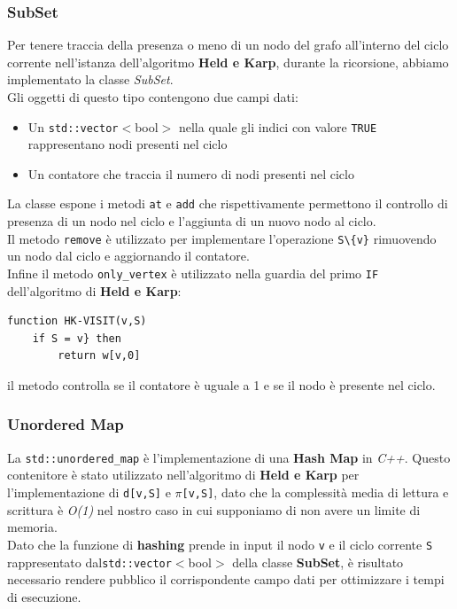 \documentclass[]{article}
\begin{document}
\subsubsection{SubSet}
\begin{flushleft}
Per tenere traccia della presenza o meno di un nodo del grafo all'interno del ciclo corrente nell'istanza dell'algoritmo \textbf{Held e Karp}, durante la ricorsione, abbiamo implementato la classe \textit{SubSet}.\\
Gli oggetti di questo tipo contengono due campi dati:
\begin{itemize}
	\item Un \verb|std::vector|$<$bool$>$ nella quale gli indici con valore \verb|TRUE| rappresentano nodi presenti nel ciclo
	\item Un contatore che traccia il numero di nodi presenti nel ciclo
\end{itemize}

La classe espone i metodi \verb|at| e \verb|add| che rispettivamente permettono il controllo di presenza di un nodo nel ciclo e l'aggiunta di un nuovo nodo al ciclo.\\
Il metodo \verb|remove| è utilizzato per implementare l'operazione \verb|S\{v}| rimuovendo un nodo dal ciclo e aggiornando il contatore.\\
Infine il metodo \verb|only_vertex| è utilizzato nella guardia del primo \verb|IF| dell'algoritmo di \textbf{Held e Karp}:
\begin{lstlisting}[mathescape=true]
function HK-VISIT(v,S)
	if S = v} then
		return w[v,0]
\end{lstlisting}
il metodo controlla se il contatore è uguale a 1 e se il nodo è presente nel ciclo.
\end{flushleft}
\subsubsection{Unordered Map}
La \verb|std::unordered_map| è l'implementazione di una \textbf{Hash Map} in \textit{C++}. Questo contenitore è stato utilizzato nell'algoritmo di \textbf{Held e Karp} per l'implementazione di \verb|d[v,S]| e $\pi$\verb|[v,S]|, dato che la complessità media di lettura e scrittura è \textit{O(1)} nel nostro caso in cui supponiamo di non avere un limite di memoria.\\
Dato che la funzione di \textbf{hashing} prende in input il nodo \verb|v| e il ciclo corrente \verb|S| rappresentato dal\verb|std::vector|$<$bool$>$ della classe \textbf{SubSet}, è risultato necessario rendere pubblico il corrispondente campo dati per ottimizzare i tempi di esecuzione.
\end{document}

